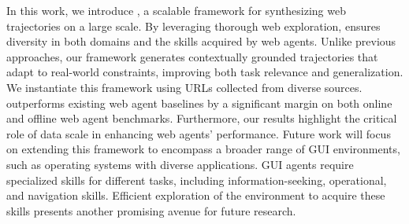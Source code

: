 In this work, we introduce \model, a scalable framework for synthesizing web trajectories on a large scale.
By leveraging thorough web exploration, \model ensures diversity in both domains and the skills acquired by web agents.
Unlike previous approaches, our framework generates contextually grounded trajectories that adapt to real-world constraints, improving both task relevance and generalization.
We instantiate this framework using URLs collected from diverse sources.
\model outperforms existing web agent baselines by a significant margin on both online and offline web agent benchmarks.
Furthermore, our results highlight the critical role of data scale in enhancing web agents' performance.
Future work will focus on extending this framework to encompass a broader range of GUI environments, such as operating systems with diverse applications.
GUI agents require specialized skills for different tasks, including information-seeking, operational, and navigation skills.
Efficient exploration of the environment to acquire these skills presents another promising avenue for future research.

